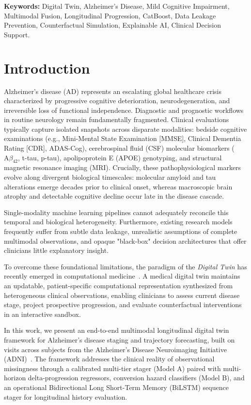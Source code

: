 \documentclass[11pt,a4paper]{article}
\begin{document}
\vspace{0.5em}
\noindent\textbf{Keywords:} Digital Twin, Alzheimer's Disease, Mild Cognitive Impairment, Multimodal Fusion, Longitudinal Progression, CatBoost, Data Leakage Prevention, Counterfactual Simulation, Explainable AI, Clinical Decision Support.

\newpage

\section{Introduction}
\label{sec:introduction}
Alzheimer's disease (AD) represents an escalating global healthcare crisis characterized by progressive cognitive deterioration, neurodegeneration, and irreversible loss of functional independence. Diagnostic and prognostic workflows in routine neurology remain fundamentally fragmented. Clinical evaluations typically capture isolated snapshots across disparate modalities: bedside cognitive examinations (e.g., Mini-Mental State Examination [MMSE], Clinical Dementia Rating [CDR], ADAS-Cog), cerebrospinal fluid (CSF) molecular biomarkers ($\text{A}\beta_{42}$, t-tau, p-tau), apolipoprotein E (APOE) genotyping, and structural magnetic resonance imaging (MRI). Crucially, these pathophysiological markers evolve along divergent biological timescales: molecular amyloid and tau alterations emerge decades prior to clinical onset, whereas macroscopic brain atrophy and detectable cognitive decline occur late in the disease cascade.

Single-modality machine learning pipelines cannot adequately reconcile this temporal and biological heterogeneity. Furthermore, existing research models frequently suffer from subtle data leakage, unrealistic assumptions of complete multimodal observations, and opaque "black-box" decision architectures that offer clinicians little explanatory insight. 

To overcome these foundational limitations, the paradigm of the \textit{Digital Twin} has recently emerged in computational medicine~\cite{nasem2023digitaltwins}. A medical digital twin maintains an updatable, patient-specific computational representation synthesized from heterogeneous clinical observations, enabling clinicians to assess current disease stage, project prospective progression, and evaluate counterfactual interventions in an interactive sandbox.

In this work, we present an end-to-end multimodal longitudinal digital twin framework for Alzheimer's disease staging and trajectory forecasting, built on \TotalRows{} visits across \TotalSubjects{} subjects from the Alzheimer's Disease Neuroimaging Initiative (ADNI)~\cite{petersen2010adni}. The framework addresses the clinical reality of observational missingness through a calibrated multi-tier stager (Model A) paired with multi-horizon delta-progression regressors, conversion hazard classifiers (Model B), and an operational Bidirectional Long Short-Term Memory (BiLSTM) sequence stager for longitudinal history evaluation.
\end{document}

